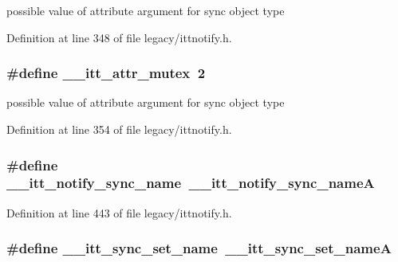 possible value of attribute argument for sync object type 



Definition at line 348 of file legacy/ittnotify.\-h.

\hypertarget{group__legacy__sync_ga8c78a4fc23e9e2ed0f3d19cd92c7a60d}{
\subsubsection[{\-\_\-\-\_\-itt\-\_\-attr\-\_\-mutex}]{\setlength{\rightskip}{0pt plus 5cm}\#define \-\_\-\-\_\-itt\-\_\-attr\-\_\-mutex~2}}\label{group__legacy__sync_ga8c78a4fc23e9e2ed0f3d19cd92c7a60d}


possible value of attribute argument for sync object type 



Definition at line 354 of file legacy/ittnotify.\-h.

\hypertarget{group__legacy__sync_ga9b2bad86cdf5af6dec15777096fad3e1}{
\subsubsection[{\-\_\-\-\_\-itt\-\_\-notify\-\_\-sync\-\_\-name}]{\setlength{\rightskip}{0pt plus 5cm}\#define \-\_\-\-\_\-itt\-\_\-notify\-\_\-sync\-\_\-name~{\bf \-\_\-\-\_\-itt\-\_\-notify\-\_\-sync\-\_\-name\-A}}}\label{group__legacy__sync_ga9b2bad86cdf5af6dec15777096fad3e1}


Definition at line 443 of file legacy/ittnotify.\-h.

\hypertarget{group__legacy__sync_gac12bf88c486ee4c22a9b96fde51c642f}{
\subsubsection[{\-\_\-\-\_\-itt\-\_\-sync\-\_\-set\-\_\-name}]{\setlength{\rightskip}{0pt plus 5cm}\#define \-\_\-\-\_\-itt\-\_\-sync\-\_\-set\-\_\-name~{\bf \-\_\-\-\_\-itt\-\_\-sync\-\_\-set\-\_\-name\-A}}}\label{group__legacy__sync_gac12bf88c486ee4c22a9b96fde51c642f}


